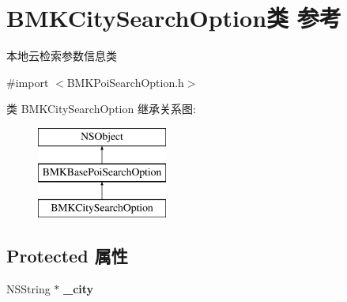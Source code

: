 \hypertarget{interface_b_m_k_city_search_option}{}\section{B\+M\+K\+City\+Search\+Option类 参考}
\label{interface_b_m_k_city_search_option}


本地云检索参数信息类  




{\ttfamily \#import $<$B\+M\+K\+Poi\+Search\+Option.\+h$>$}

类 B\+M\+K\+City\+Search\+Option 继承关系图\+:\begin{figure}[H]
\begin{center}
\leavevmode
\includegraphics[height=3.000000cm]{interface_b_m_k_city_search_option}
\end{center}
\end{figure}
\subsection*{Protected 属性}
\begin{DoxyCompactItemize}
\item 
\hypertarget{interface_b_m_k_city_search_option_a6d14cd2f7fcac7cd601ef9bfd0439720}{}N\+S\+String $\ast$ {\bfseries \+\_\+city}\label{interface_b_m_k_city_search_option_a6d14cd2f7fcac7cd601ef9bfd0439720}

\end{DoxyCompactItemize}

